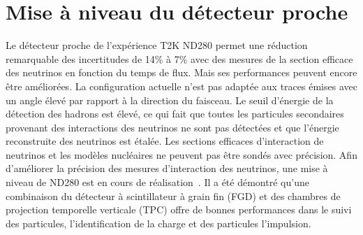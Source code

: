 \documentclass[../main.tex]{subfiles}
\begin{document}
\setcounter{section}{1}
\section*{Mise à niveau du détecteur proche}

Le détecteur proche de l'expérience T2K ND280 permet une réduction remarquable des incertitudes de 14\% à 7\% avec des mesures de la section efficace des neutrinos en fonction du temps de flux. Mais ses performances peuvent encore être améliorées. La configuration actuelle n'est pas adaptée aux traces émises avec un angle élevé par rapport à la direction du faisceau. Le seuil d'énergie de la détection des hadrons est élevé, ce qui fait que toutes les particules secondaires provenant des interactions des neutrinos ne sont pas détectées et que l'énergie reconstruite des neutrinos est étalée. Les sections efficaces d'interaction de neutrinos et les modèles nucléaires ne peuvent pas être sondés avec précision. Afin d'améliorer la précision des mesures d'interaction des neutrinos, une mise à niveau de ND280 est en cours de réalisation~\cite{Abe2019}. Il a été démontré qu'une combinaison du détecteur à scintillateur à grain fin (FGD) et des chambres de projection temporelle verticale (TPC) offre de bonnes performances dans le suivi des particules, l'identification de la charge et des particules l'impulsion.

\end{document}
